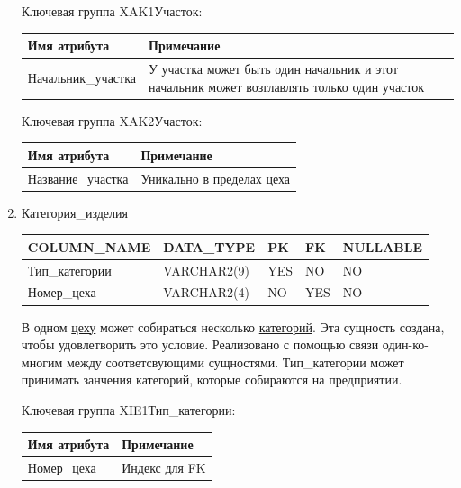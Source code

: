 \begin{enumerate}
    Ключевая группа XAK1Участок:

    \begin{tabular}{|p{7cm}|p{9.3cm}|} \hline

        {\bf Имя атрибута} & {\bf Примечание} \\ \hline
        Начальник\_участка & У участка может быть один начальник и этот начальник может возглавлять только один участок \\ \hline

    \end{tabular}

    Ключевая группа XAK2Участок:

    \begin{tabular}{|p{7cm}|p{9.3cm}|} \hline

        {\bf Имя атрибута} & {\bf Примечание} \\ \hline
        Название\_участка & Уникально в пределах цеха \\ \hline

    \end{tabular}

    \item{Категория\_изделия}

    \begin{tabular}{|p{7cm}|p{3cm}|p{1cm}|p{1cm}|p{3cm}|} \hline

        {\bf COLUMN\_NAME} & {\bf DATA\_TYPE} & {\bf PK} & {\bf FK} & {\bf NULLABLE} \\ \hline
        Тип\_категории & VARCHAR2(9) & YES & NO & NO \\ \hline
        Номер\_цеха & VARCHAR2(4) & NO & YES & NO \\ \hline

    \end{tabular}

    В одном \underline{цеху} может собираться несколько \underline{категорий}.
    Эта сущность создана, чтобы удовлетворить это условие. Реализовано с помощью связи один-ко-многим между соответсвующими сущностями.
    Тип\_категории может принимать занчения категорий, которые собираются на предприятии.

    Ключевая группа XIE1Тип\_категории:

    \begin{tabular}{|p{7cm}|p{9.3cm}|} \hline

        {\bf Имя атрибута} & {\bf Примечание} \\ \hline
        Номер\_цеха & Индекс для FK \\ \hline


\end{tabular}
\end{enumerate}
